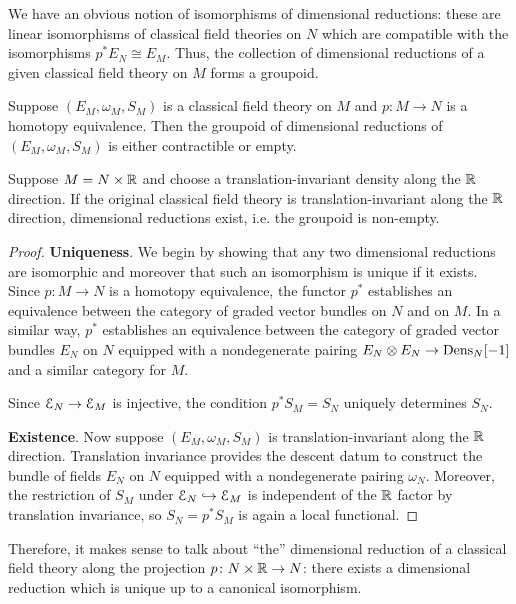 \documentclass[10pt, oneside]{article}
\begin{document}
We have an obvious notion of isomorphisms of dimensional reductions: these are linear isomorphisms of classical field theories on $N$ which are compatible with the isomorphisms $p^* E_N\cong E_M$. Thus, the collection of dimensional reductions of a given classical field theory on $M$ forms a groupoid.

\begin{prop}
Suppose $(E_M, \omega_M, S_M)$ is a classical field theory on $M$ and $p\colon M\rightarrow N$ is a homotopy equivalence. Then the groupoid of dimensional reductions of $(E_M, \omega_M, S_M)$ is either contractible or empty.

Suppose $M=N\times \mathbb R$ and choose a translation-invariant density along the $\mathbb R$ direction. If the original classical field theory is translation-invariant along the $\mathbb R$ direction, dimensional reductions exist, i.e. the groupoid is non-empty.
\label{prop:dimensionalreductionunique}
\end{prop}
\begin{proof} \textbf{Uniqueness}. We begin by showing that any two dimensional reductions are isomorphic and moreover that such an isomorphism is unique if it exists. Since $p\colon M\rightarrow N$ is a homotopy equivalence, the functor $p^*$ establishes an equivalence between the category of graded vector bundles on $N$ and on $M$. In a similar way, $p^*$ establishes an equivalence between the category of graded vector bundles $E_N$ on $N$ equipped with a nondegenerate pairing $E_N\otimes E_N\rightarrow \mathrm{Dens}_N[-1]$ and a similar category for $M$.

Since $\mathcal E_N\rightarrow \mathcal E_M$ is injective, the condition $p^* S_M = S_N$ uniquely determines $S_N$.

\textbf{Existence}. Now suppose $(E_M, \omega_M, S_M)$ is translation-invariant along the $\mathbb R$ direction. Translation invariance provides the descent datum to construct the bundle of fields $E_N$ on $N$ equipped with a nondegenerate pairing $\omega_N$. Moreover, the restriction of $S_M$ under $\mathcal E_N\hookrightarrow \mathcal E_M$ is independent of the $\mathbb R$ factor by translation invariance, so $S_N=p^* S_M$ is again a local functional.
\end{proof}

\begin{remark}
Therefore, it makes sense to talk about ``the'' dimensional reduction of a classical field theory along the projection $p \colon N \times \mathbb R \to N$: there exists a dimensional reduction which is unique up to a canonical isomorphism.
\end{remark}
\end{document}
